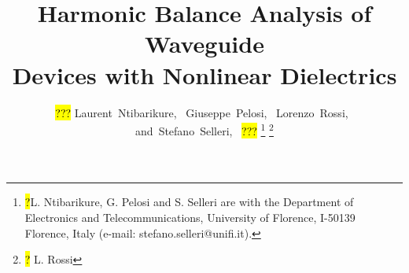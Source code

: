 \documentclass[journal]{IEEEtran}
\begin{document}

%
\title{Harmonic Balance Analysis of Waveguide \\ Devices with Nonlinear Dielectrics}
%
%
%
\author{ \hl{???}
        Laurent~Ntibarikure,~
		Giuseppe~Pelosi,~
		Lorenzo~Rossi,~%
        and~Stefano~Selleri,~
        \hl{???}%
        \thanks{ \hl{?}L. Ntibarikure, G. Pelosi and S. Selleri are with the
        Department of Electronics and Telecommunications, University of 
        Florence, I-50139 Florence, Italy (e-mail: stefano.selleri@unifi.it).}
		\thanks{\hl{?} L. Rossi} 
	  }
 

% 
%
\end{document}
